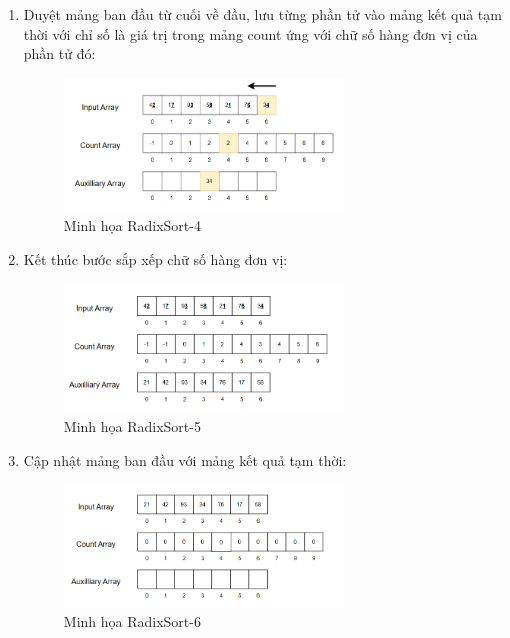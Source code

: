 \begin{enumerate}
    \item Duyệt mảng ban đầu từ cuối về đầu, lưu từng phần tử vào mảng kết quả tạm thời với chỉ số là giá trị trong mảng count ứng với chữ số hàng đơn vị của phần tử đó:
    \begin{figure}[H]
        \centering
        \includegraphics[width=0.7\textwidth]{img/radix_sort/4.png}
        \caption{Minh họa RadixSort-4}
    \end{figure}
    
    \item Kết thúc bước sắp xếp chữ số hàng đơn vị:
    \begin{figure}[H]
        \centering
        \includegraphics[width=0.7\textwidth]{img/radix_sort/5.png}
        \caption{Minh họa RadixSort-5}
    \end{figure}
    
    \item Cập nhật mảng ban đầu với mảng kết quả tạm thời:
    \begin{figure}[H]
        \centering
        \includegraphics[width=0.7\textwidth]{img/radix_sort/6.png}
        \caption{Minh họa RadixSort-6}
    \end{figure}
    

\end{enumerate}

